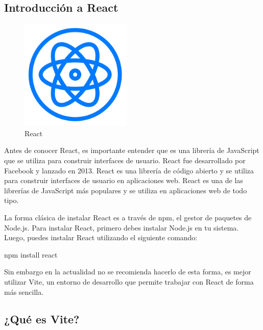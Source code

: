 \documentclass[
  a4paper,
  DIV=11,
  numbers=noendperiod,
  onepage,
  openany]{scrreprt}
\newenvironment{Shaded}{\begin{snugshade}}{\end{snugshade}}
\newcommand{\ExtensionTok}[1]{\textcolor[rgb]{0.00,0.23,0.31}{#1}}
\newcommand{\NormalTok}[1]{\textcolor[rgb]{0.00,0.23,0.31}{#1}}
\begin{document}
\begin{tcolorbox}
\chapter{Introducción a React}\label{introducciuxf3n-a-react}

\begin{figure}[H]

{\centering \includegraphics[width=2.08333in,height=\textheight]{images/react-logo.png}

}

\caption{React}

\end{figure}%

Antes de conocer React, es importante entender que es una librería de
JavaScript que se utiliza para construir interfaces de usuario. React
fue desarrollado por Facebook y lanzado en 2013. React es una librería
de código abierto y se utiliza para construir interfaces de usuario en
aplicaciones web. React es una de las librerías de JavaScript más
populares y se utiliza en aplicaciones web de todo tipo.

La forma clásica de instalar React es a través de npm, el gestor de
paquetes de Node.js. Para instalar React, primero debes instalar Node.js
en tu sistema. Luego, puedes instalar React utilizando el siguiente
comando:

\begin{Shaded}
\begin{Highlighting}[]
\ExtensionTok{npm}\NormalTok{ install react}
\end{Highlighting}
\end{Shaded}

Sin embargo en la actualidad no se recomienda hacerlo de esta forma, es
mejor utilizar Vite, un entorno de desarrollo que permite trabajar con
React de forma más sencilla.

\section{¿Qué es Vite?}\label{quuxe9-es-vite}


\end{tcolorbox}
\end{document}
